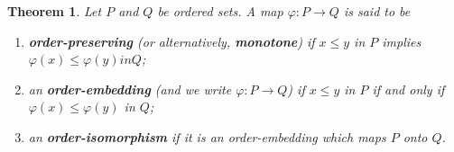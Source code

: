 \documentclass[a4paper,12pt,oneside]{report}%
\newtheorem{theorem}{Theorem}
\begin{document}
\begin{theorem}
Let $P$ and $Q$ be ordered sets. A map $\varphi: P \rightarrow Q$ is said to be
    \begin{enumerate}
        \item \textbf{order-preserving} (or alternatively, \textbf{monotone}) if
            $x \leq y$ in $P$ implies $\varphi(x) \leq \varphi(y) in Q$;
        \item an \textbf{order-embedding} (and we write 
            $\varphi: P \rightarrow Q$) if $x \leq y$ in $P$ if and only if
            $\varphi(x) \leq \varphi(y)$ in $Q$;
        \item an \textbf{order-isomorphism} if it is an order-embedding which
            maps $P$ onto $Q$.
    \end{enumerate}
\end{theorem}
\end{document}

